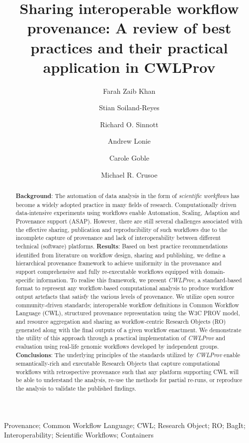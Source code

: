 \documentclass[a4paper,num-refs]{oup-contemporary}
\title{Sharing interoperable workflow provenance: A review of best practices and their practical application in CWLProv}
\author[1,2,\authfn{1}]{Farah Zaib Khan} %
\author[2,3,\authfn{1}]{Stian Soiland-Reyes} %
\author[1,\authfn{1}]{Richard O. Sinnott} %
\author[1,\authfn{1}]{Andrew Lonie} %
\author[3,\authfn{1}]{Carole Goble} %
\author[2,\authfn{1}]{Michael R. Crusoe} %
\affil[1]{The University of Melbourne, Australia }
\affil[2]{Common Workflow Language Project}
\affil[3]{The University of Manchester, UK}
\begin{document}
\begin{frontmatter}
\maketitle
\begin{abstract}
 \textbf{Background}: The automation of data analysis in the form of \textit{scientific workflows} has become a widely adopted practice in many fields of research. Computationally driven data-intensive experiments using workflows enable Automation, Scaling, Adaption and Provenance support (ASAP). However, there are still several challenges associated with the effective sharing, publication and reproducibility of such workflows due to the incomplete capture of provenance and lack of interoperability between different technical (software) platforms.
 \newline 
 \textbf{Results}: Based on best practice recommendations identified from literature on workflow design, sharing and publishing, we define a hierarchical provenance framework to achieve uniformity in the provenance and support comprehensive and fully re-executable workflows equipped with domain-specific information. To realise this framework, we present \textit{CWLProv}, a standard-based format to represent any workflow-based computational analysis to produce workflow output artefacts that satisfy the various levels of provenance. We utilize open source community-driven standards; interoperable workflow definitions in Common Workflow Language (CWL), structured provenance representation using the W3C PROV model, and resource aggregation and sharing as workflow-centric Research Objects (RO) generated along with the final outputs of a given workflow enactment. We demonstrate the utility of this approach through a practical implementation of \textit{CWLProv} and evaluation using real-life genomic workflows developed by independent groups. 
 \newline 
 \textbf{Conclusions}: The underlying principles of the standards utilized by \textit{CWLProv} enable semantically-rich and executable Research Objects that capture computational workflows with retrospective provenance such that any platform supporting CWL will be able to understand the analysis, re-use the methods for partial re-runs, or reproduce the analysis to validate the published findings. 
\end{abstract}

\begin{keywords}
Provenance; Common Workflow Language; CWL; Research Object; RO; BagIt; Interoperability; Scientific Workflows; Containers
\end{keywords}
\end{frontmatter}
\end{document}
